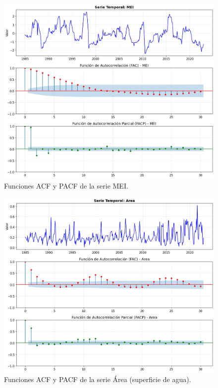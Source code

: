 \begin{figure}[H]
    \centering
    \includegraphics[scale=.42]{Figures/facp_MEI.png}
    \caption{Funciones ACF y PACF de la serie MEI.}
    \label{fig:facp_mei}
\end{figure}

\begin{figure}[H]
    \centering
    \includegraphics[scale=.42]{Figures/facp_Area.png}
    \caption{Funciones ACF y PACF de la serie Área (superficie de agua).}
    \label{fig:facp_area}
\end{figure}


